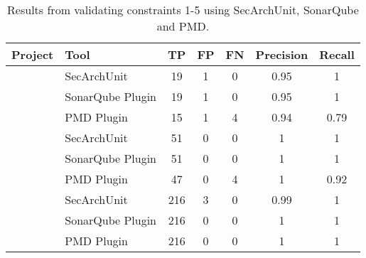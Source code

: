 \begin{table}[ht]
\begin{center}
\begin{tabular}{lxggggg}
\textbf{Project} & \textbf{Tool} & \textbf{TP} & \textbf{FP} & \textbf{FN} & \textbf{Precision} & \textbf{Recall} \\
\hline
{}
        & SecArchUnit & 19 & 1 & 0 & 0.95 & 1 \\
        & SonarQube Plugin & 19 & 1 & 0 & 0.95 & 1 \\
        & PMD Plugin & 15 & 1 & 4 & 0.94 & 0.79 \\
\hline
{}
        & SecArchUnit & 51 & 0 & 0 & 1 & 1 \\
        & SonarQube Plugin & 51 & 0 & 0 & 1 & 1 \\
        & PMD Plugin & 47 & 0 & 4 & 1 & 0.92 \\
\hline
{}
        & SecArchUnit & 216 & 3 & 0 & 0.99 & 1 \\
        & SonarQube Plugin & 216 & 0 & 0 & 1 & 1 \\
        & PMD Plugin & 216 & 0 & 0 & 1 & 1 \\
\hline
\end{tabular}
\end{center}
\caption{Results from validating constraints 1-5 using SecArchUnit, SonarQube and PMD.}
\label{tab:results_comparison}
\end{table}
